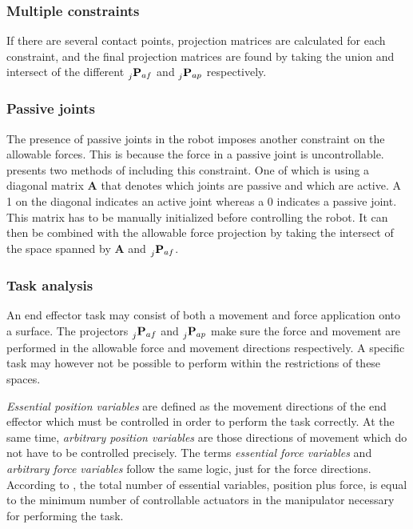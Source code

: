 \subsubsection{Multiple constraints}\label{subseq:mult_contacts}

If there are several contact points, projection matrices are calculated for each constraint, and the final projection matrices are found by taking the union and intersect of the different $\prescript{}{j}{\mathbf{P}}_{af}$ and $\prescript{}{j}{\mathbf{P}}_{ap}$ respectively.

\subsubsection{Passive joints}

The presence of passive joints in the robot imposes another constraint on the allowable forces. This is because the force in a passive joint is uncontrollable. \cite{west1985method} presents two methods of including this constraint. One of which is using a diagonal matrix $\mathbf{A}$ that denotes which joints are passive and which are active. A 1 on the diagonal indicates an active joint whereas a 0 indicates a passive joint. This matrix has to be manually initialized before controlling the robot. It can then be combined with the allowable force projection by taking the intersect of the space spanned by $\mathbf{A}$ and $\prescript{}{j}{\mathbf{P}}_{af}$.

\subsubsection{Task analysis}

An end effector task may consist of both a movement and force application onto a surface. The projectors $\prescript{}{j}{\mathbf{P}}_{af}$ and $\prescript{}{j}{\mathbf{P}}_{ap}$ make sure the force and movement are performed in the allowable force and movement directions respectively. A specific task may however not be possible to perform within the restrictions of these spaces.

\textit{Essential position variables} are defined as the movement directions of the end effector which must be controlled in order to perform the task correctly. At the same time, \textit{arbitrary position variables} are those directions of movement which do not have to be controlled precisely. The terms \textit{essential force variables} and \textit{arbitrary force variables} follow the same logic, just for the force directions. According to \cite{west1985method}, the total number of essential variables, position plus force, is equal to the minimum number of controllable actuators in the manipulator necessary for performing the task.

